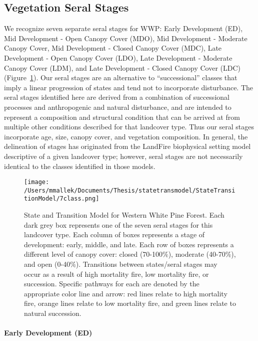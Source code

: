\subsection*{Vegetation Seral Stages}
We recognize seven separate seral stages for WWP: Early Development (ED), Mid Development - Open Canopy Cover (MDO), Mid Development - Moderate Canopy Cover, Mid Development - Closed Canopy Cover (MDC), Late Development - Open Canopy Cover (LDO), Late Development - Moderate Canopy Cover (LDM), and Late Development - Closed Canopy Cover (LDC) (Figure~\ref{transmodel_wwp}). Our seral stages are an alternative to ``successional'' classes that imply a linear progression of states and tend not to incorporate disturbance. The seral stages identified here are derived from a combination of successional processes and anthropogenic and natural disturbance, and are intended to represent a composition and structural condition that can be arrived at from multiple other conditions described for that landcover type. Thus our seral stages incorporate age, size, canopy cover, and vegetation composition. In general, the delineation of stages has originated from the LandFire biophysical setting model descriptive of a given landcover type; however, seral stages are not necessarily identical to the classes identified in those models.


\begin{figure}[hbp]
\centering
\texttt{[image: /Users/mmallek/Documents/Thesis/statetransmodel/StateTransitionModel/7class.png]}
\caption{State and Transition Model for Western White Pine Forest. Each dark grey box represents one of the seven seral stages for this landcover type. Each column of boxes represents a stage of development: early, middle, and late. Each row of boxes represents a different level of canopy cover: closed (70-100\%), moderate (40-70\%), and open (0-40\%). Transitions between states/seral stages may occur as a result of high mortality fire, low mortality fire, or succession. Specific pathways for each are denoted by the appropriate color line and arrow: red lines relate to high mortality fire, orange lines relate to low mortality fire, and green lines relate to natural succession.} 
\label{transmodel_wwp}
\end{figure}

\paragraph{Early Development (ED)}

